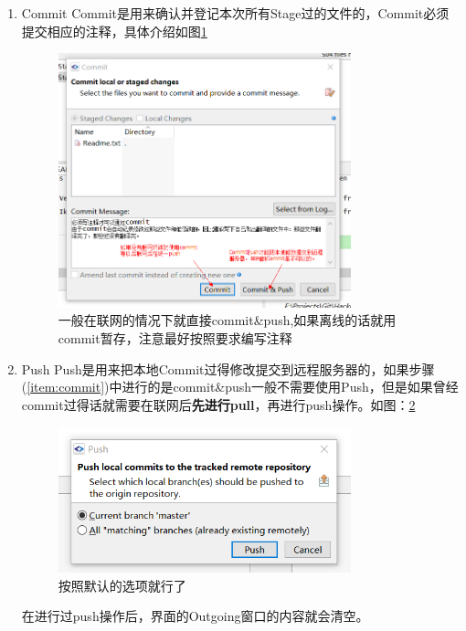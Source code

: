 \documentclass[10pt,a4paper,UTF8]{article}
\begin{document}
\begin{enumerate}[(1)]
            \item \label{item:commit} Commit
                Commit是用来确认并登记本次所有Stage过的文件的，Commit必须提交相应的注释，具体介绍如图\ref{fig:commit}
                \begin{figure}[H]
                    \centering
                    \includegraphics[width=0.8\textwidth]{commit.png}
                    \caption{一般在联网的情况下就直接commit\&push,如果离线的话就用commit暂存，注意最好按照要求编写注释}
                    \label{fig:commit}
                \end{figure}

            \item Push
                Push是用来把本地Commit过得修改提交到远程服务器的，如果步骤(\ref{item:commit})中进行的是commit\&push一般不需要使用Push，但是如果曾经commit过得话就需要在联网后\textbf{先进行pull}，再进行push操作。如图：\ref{fig:push}
                \begin{figure}[H]
                    \centering
                    \includegraphics[width=0.8\textwidth]{push1.png}
                    \caption{按照默认的选项就行了}
                    \label{fig:push}
                \end{figure}

                在进行过push操作后，界面的Outgoing窗口的内容就会清空。



        \end{enumerate}
\end{document}
